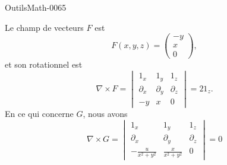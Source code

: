 
\begin{corrige}{OutilsMath-0065}

    Le champ de vecteurs $F$ est 
    \begin{equation}
        F(x,y,z)=\begin{pmatrix}
            -y    \\ 
            x    \\ 
            0    
        \end{pmatrix},
    \end{equation}
    et son rotationnel est
    \begin{equation}
        \nabla\times F=\begin{vmatrix}
            1_x    &  1_y     &   1_z    \\
            \partial_x    &   \partial_y    &   \partial_z    \\
            -y    &   x    &   0
        \end{vmatrix}=21_z.
    \end{equation}
    En ce qui concerne $G$, nous avons
    \begin{equation}
        \nabla\times G=\begin{vmatrix}
            1_x &   1_y &   1_z \\
            \partial_x  &   \partial_y  &   \partial_z  \\
            -\frac{ u }{ x^2+y^2 }    &   \frac{ x }{ x^2+y^2 }    &   0
        \end{vmatrix}=0
    \end{equation}

\end{corrige}
